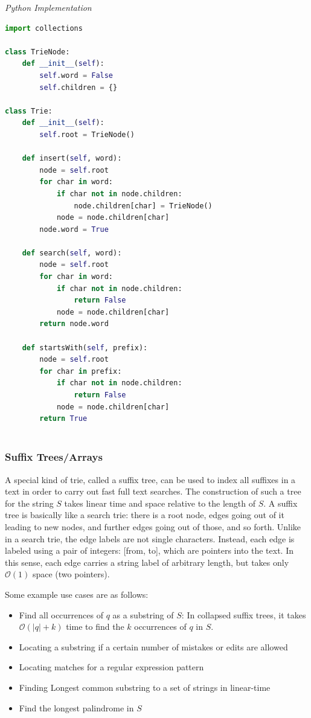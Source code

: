 \documentclass{article}
\newcommand{\bigO}{\mathcal{O}}
\begin{document}
\vspace{8pt} \emph{Python Implementation}
\begin{lstlisting}[language=Python]
import collections

class TrieNode:
    def __init__(self):
        self.word = False
        self.children = {}

class Trie:
    def __init__(self):
        self.root = TrieNode()

    def insert(self, word):
        node = self.root
        for char in word:
            if char not in node.children:
                node.children[char] = TrieNode()
            node = node.children[char]
        node.word = True

    def search(self, word):
        node = self.root
        for char in word:
            if char not in node.children:
                return False
            node = node.children[char]
        return node.word

    def startsWith(self, prefix):
        node = self.root
        for char in prefix:
            if char not in node.children:
                return False
            node = node.children[char]
        return True
    
\end{lstlisting}

    \subsubsection{Suffix Trees/Arrays}
    A special kind of trie, called a suffix tree, can be used to index all suffixes in a text in order to carry out fast full text searches. The construction of such a tree for the string $S$ takes linear time and space relative to the length of $S$. A suffix tree is basically like a search trie: there is a root node, edges going out of it leading to new nodes, and further edges going out of those, and so forth. Unlike in a search trie, the edge labels are not single characters. Instead, each edge is labeled using a pair of integers: [from, to], which are pointers into the text. In this sense, each edge carries a string label of arbitrary length, but takes only $\bigO(1)$ space (two pointers).
    
    Some example use cases are as follows:
    \begin{itemize}
        \item Find all occurrences of $q$ as a substring of $S$: In collapsed suffix trees, it takes $\bigO(|q| + k)$ time to find the $k$ occurrences of $q$ in $S$.
        \item Locating a substring if a certain number of mistakes or edits are allowed
        \item Locating matches for a regular expression pattern
        \item Finding Longest common substring to a set of strings in linear-time
        \item Find the longest palindrome in $S$
    \end{itemize}
    
\end{document}
